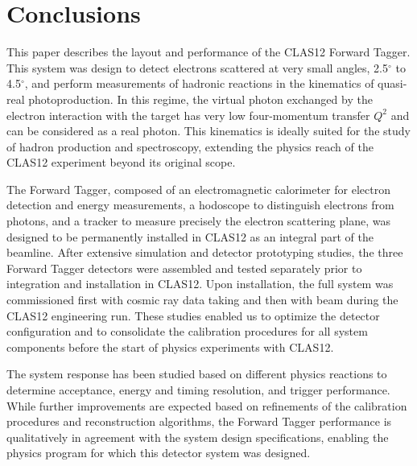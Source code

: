 \section{Conclusions}

This paper describes the layout and performance of the CLAS12 Forward Tagger. This system was design to detect
electrons scattered at very small angles, 2.5$^\circ$ to 4.5$^\circ$, and perform measurements of hadronic reactions
in the kinematics of quasi-real photoproduction. In this regime, the virtual photon exchanged by the electron
interaction with the target has very low four-momentum transfer $Q^2$ and can be considered as a real photon. This
kinematics is ideally suited for the study of hadron production and spectroscopy,  extending the physics reach of the
CLAS12 experiment beyond its original scope.

The Forward Tagger, composed of an electromagnetic calorimeter for electron detection and energy measurements,
a hodoscope to distinguish electrons from photons, and a tracker to measure precisely the electron scattering plane,
was designed to be permanently installed in CLAS12 as an integral part of the beamline. After extensive simulation
and detector prototyping studies, the three Forward Tagger detectors were assembled and tested separately prior
to integration and installation in CLAS12. Upon installation, the full system was commissioned first with cosmic ray
data taking and then with beam during the CLAS12 engineering run. These studies enabled us to optimize the detector
configuration and to consolidate the calibration procedures for all system components before the start of physics
experiments with CLAS12.

The system response has been studied based on different physics reactions to determine acceptance, energy and
timing resolution, and trigger performance. While further improvements are expected based on refinements of the
calibration procedures and reconstruction algorithms, the Forward Tagger performance is qualitatively in agreement
with the system design specifications, enabling the physics program for which this detector system was designed.
 